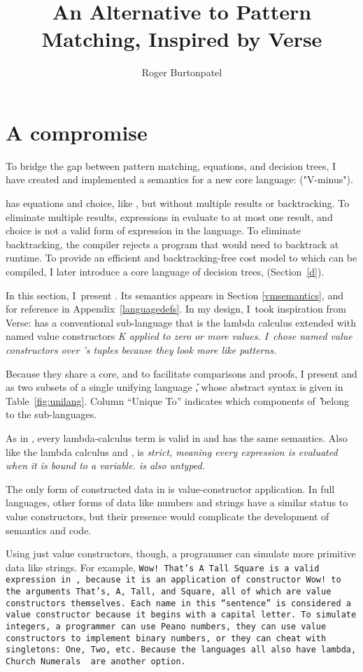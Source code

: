\documentclass[manuscript,screen,review, 12pt, nonacm]{acmart}
\title{An Alternative to Pattern Matching, Inspired by Verse}
\author{Roger Burtonpatel}
\affiliation{%
\institution{Tufts University}
\streetaddress{419 Boston Ave}
  \city{Medford}
  \state{Massachusetts}
  \country{USA}
  \postcode{02155}
  }
\begin{document}
  
\section{A compromise}
\label{compromise}
    
    To bridge the gap between pattern matching, equations, and decision trees, I
    have created and implemented a semantics for a new core language: \VMinus
    ("V-minus"). 
    
    \VMinus has equations and choice, like \VC, but without multiple results or
    backtracking. To eliminate multiple results, expressions in \VMinus evaluate
    to at most one result, and choice is not a valid form of expression in the
    language. To eliminate backtracking, the compiler rejects a \VMinus program
    that would need to backtrack at runtime. To provide an efficient and
    backtracking-free cost model to which \VMinus can be compiled, I later
    introduce a core language of decision trees, \D (Section~\ref{d}).
    
    In this section, I~present \VMinus. Its semantics appears in Section
    \ref{vmsemantics}, and for reference in Appendix~\ref{languagedefs}. In my
    design, I~took inspiration from Verse: \VMinus has a conventional
    sub-language that is the lambda calculus extended with named value
    constructors \it{K} applied to zero or more values. I~chose named value
    constructors over \VC's tuples because they look more like patterns. 
    
    Because they share a core, and to facilitate comparisons and proofs, I
    present \VMinus and \D as two subsets of a single unifying language \U,
    whose abstract syntax is given in Table~\ref{fig:unilang}. Column “Unique
    To” indicates which components of \U\ belong to the sub-languages. 
    
    As in \VC, every lambda-calculus term is valid in \VMinus and has the same
    semantics. Also like the lambda calculus and \VC, \VMinus is \it{strict},
    meaning every expression is evaluated when it is bound to a variable.
    \VMinus is also untyped. 
    
    The only form of constructed data in \VMinus is value-constructor
    application. In full languages, other forms of data like numbers and strings
    have a similar status to value constructors, but their presence would
    complicate the development of semantics and code. 
    
    Using just value constructors, though, a programmer can simulate more
    primitive data like strings. For example, \tt{Wow! That's A Tall Square} is
    a valid expression in \VMinus, because it is an application of constructor
    \tt{Wow!} to the arguments \tt{That's}, \tt{A}, \tt{Tall}, and \tt{Square},
    all of which are value constructors themselves. Each name in this “sentence”
    is considered a value constructor because it begins with a capital letter.
    To simulate integers, a programmer can use Peano numbers, they can use value
    constructors to implement binary numbers, or they can cheat with singletons:
    \tt{One}, \tt{Two}, etc. Because the languages all also have lambda, Church
    Numerals~\citep{church1985calculi} are another option. 
\end{document}
